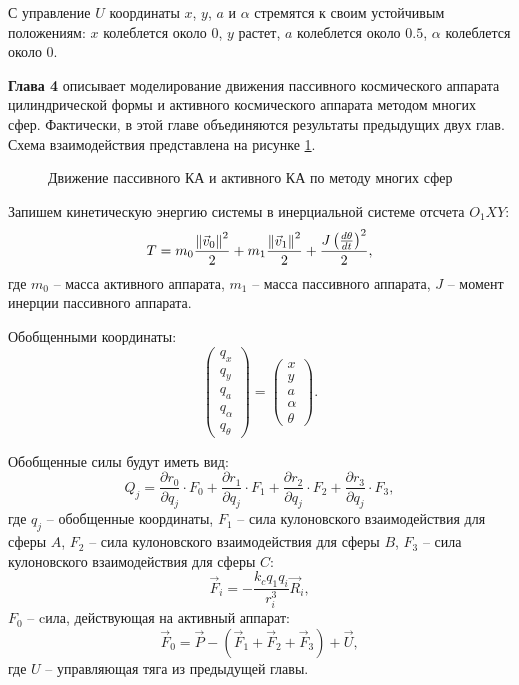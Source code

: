С управление $U$ координаты $x$, $y$, $a$ и $\alpha$ стремятся к своим устойчивым положениям: $x$ колеблется около 0, $y$ растет,  $a$ колеблется около $0.5$, $\alpha$ колеблется около 0.

\textbf{Глава 4} описывает моделирование движения пассивного космического аппарата цилиндрической формы и активного космического аппарата методом многих сфер. Фактически, в этой главе объединяются результаты предыдущих двух глав.
Схема взаимодействия представлена на рисунке \ref{ris:2sph_msm}.

\begin{figure}[H]
	\caption{Движение пассивного КА и активного КА по методу многих сфер}
	\label{ris:2sph_msm}
\end{figure}

Запишем кинетическую энергию системы в инерциальной системе отсчета $O_1XY$:
\begin{equation*}
\label{eq:2sph_msm_T}
	T = m_0 \frac{\left\lVert\vec{v}_0\right\rVert^2}{2} + m_1 \frac{\left\lVert\vec{v}_1\right\rVert^2}{2} + \frac{J\left(\frac{d\theta}{dt}\right)^2}{2},
\end{equation*}
где $m_0$ – масса активного аппарата, $m_1$ – масса пассивного аппарата, $J$ – момент инерции пассивного аппарата.

Обобщенными координаты:
\begin{equation*}
\label{eq:2sph_msm_qj}
	\begin{pmatrix}
		q_x \\
		q_y \\
		q_a \\
		q_\alpha \\
		q_\theta
	\end{pmatrix} 
	=
	\begin{pmatrix}
		x \\
		y \\
		a \\
		\alpha \\
		\theta
	\end{pmatrix}.
\end{equation*}

Обобщенные силы будут иметь вид:
\begin{equation*}
\label{eq:2sph_msm_Q}
	Q_j = \frac{\partial r_0}{\partial q_j} \cdot F_0 + \frac{\partial r_1}{\partial q_j} \cdot F_1 +\frac{\partial r_2}{\partial q_j} \cdot F_2 +\frac{\partial r_3}{\partial q_j} \cdot F_3,
\end{equation*}
где $q_j$ – обобщенные координаты, $F_1$ – сила кулоновского взаимодействия для сферы $A$, $F_2$ – сила кулоновского взаимодействия для сферы $B$, $F_3$ – сила кулоновского взаимодействия для сферы $C$:
\begin{equation*}
\label{eq:2sph_msm_f1}
	\vec{F}_i = -\frac{k_c q_1 q_{i}}{r_i^3}\vec{R}_i,
\end{equation*}
$F_0$ – cила, действующая на активный аппарат:
\begin{equation*}
\label{eq:2sph_msm_f0_u}
	\vec{F}_0 = \vec{P} - (\vec{F}_1 + \vec{F}_2 + \vec{F}_3) + \vec{U},
\end{equation*}
где $U$ – управляющая тяга из предыдущей главы.

